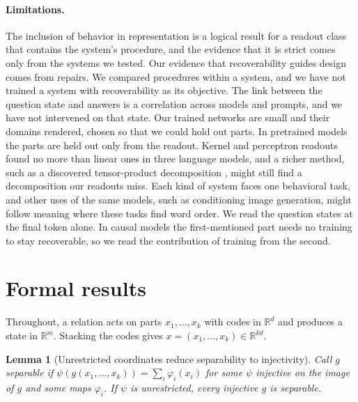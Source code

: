 \documentclass[10pt]{article}
\theoremstyle{plain}
\newtheorem{lemma}{Lemma}
\theoremstyle{remark}
\newcommand{\R}{\mathbb{R}}
\begin{document}
\paragraph{Limitations.} The inclusion of behavior in representation is a logical result for a readout class that contains the system's procedure, and the evidence that it is strict comes only from the systems we tested. Our evidence that recoverability guides design comes from repairs. We compared procedures within a system, and we have not trained a system with recoverability as its objective. The link between the question state and answers is a correlation across models and prompts, and we have not intervened on that state. Our trained networks are small and their domains rendered, chosen so that we could hold out parts. In pretrained models the parts are held out only from the readout. Kernel and perceptron readouts found no more than linear ones in three language models, and a richer method, such as a discovered tensor-product decomposition \citep{mccoy2019}, might still find a decomposition our readouts miss. Each kind of system faces one behavioral task, and other uses of the same models, such as conditioning image generation, might follow meaning where these tasks find word order. We read the question states at the final token alone. In causal models the first-mentioned part needs no training to stay recoverable, so we read the contribution of training from the second.

\FloatBarrier



\clearpage
\appendix
\makeatletter\let\@fb@secFB\relax\makeatother %

\section{Formal results}
\label{app:proofs}

Throughout, a relation acts on parts $x_1, \ldots, x_k$ with codes in $\R^d$ and produces a state in $\R^m$. Stacking the codes gives $x = (x_1, \ldots, x_k) \in \R^{kd}$.



\begin{lemma}[Unrestricted coordinates reduce separability to injectivity]
\label{lem:psi}
Call $g$ separable if $\psi(g(x_1, \ldots, x_k)) = \sum_i \varphi_i(x_i)$ for some $\psi$ injective on the image of $g$ and some maps $\varphi_i$. If $\psi$ is unrestricted, every injective $g$ is separable.
\end{lemma}
\end{document}

